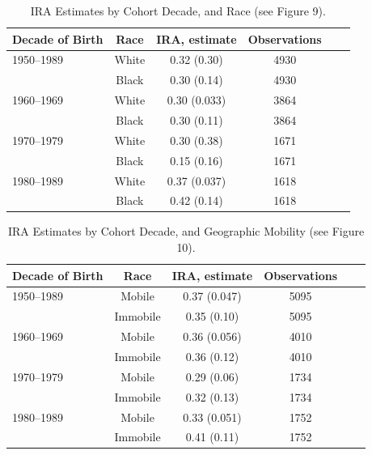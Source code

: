 \documentclass[notitlepage,12pt]{article}
\begin{document}
\begin{table}[H]
\centering
\caption{IRA Estimates by Cohort Decade, and Race (see Figure 9).}
\begin{tabular}{lc|cccc}
\midrule
Decade of Birth & Race & IRA, estimate         & Observations & \\
\midrule
1950--1989  & White & 0.32 (0.30)  &4930  \\
& Black  &   0.30 (0.14) & 4930\\ \hline
1960--1969  & White & 0.30 (0.033) &3864   \\
& Black    & 0.30 (0.11) & 3864\\ \hline
1970--1979  & White  &  0.30 (0.38) &1671 \\
& Black  &  0.15 (0.16) & 1671 \\ \hline
1980--1989  & White  & 0.37 (0.037) & 1618  \\
& Black  &  0.42 (0.14) & 1618 \\ 
\midrule \bottomrule
\end{tabular}
\end{table}

\begin{table}[H]
\centering
\caption{IRA Estimates by Cohort Decade, and Geographic Mobility (see Figure 10).}
\begin{tabular}{lc|cccc}
\midrule
Decade of Birth & Race & IRA, estimate          & Observations & \\
\midrule
1950--1989  & Mobile & 0.37 (0.047)   &5095  \\
& Immobile  &   0.35 (0.10)  & 5095\\ \hline
1960--1969  & Mobile & 0.36 (0.056)  &4010   \\
& Immobile    & 0.36 (0.12) & 4010\\ \hline
1970--1979  & Mobile  &  0.29 (0.06) &1734 \\
& Immobile  &  0.32 (0.13) & 1734 \\ \hline
1980--1989  & Mobile  & 0.33 (0.051) & 1752 \\
& Immobile  &  0.41 (0.11) & 1752 \\ 
\midrule \bottomrule
\end{tabular}
\end{table}
\end{document}
